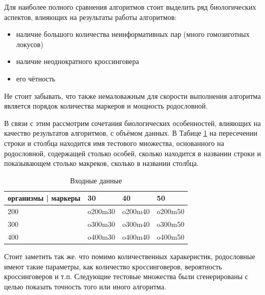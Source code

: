 \documentclass{matmex-diploma-custom}
\begin{document}
Для наиболее полного сравнения алгоритмов стоит выделить ряд
биологических аспектов, влияющих на результаты работы алгоритмов:
\begin{itemize}
\item наличие большого количества неинформативных пар (много
  гомозиготных локусов)
\item наличие неоднократного кроссинговера
\item его чётность
\end{itemize}

Не стоит забывать, что также немаловажным для скорости выполнения
алгоритма является порядок количества маркеров и мощность родословной.

В связи с этим рассмотрим сочетания биологических особенностей,
влияющих на качество результатов алгоритмов, с объёмом данных.  В
Табице \ref{tab:data} на пересечении строки и столбца находится имя
тестового множества, основанного на родословной, содержащей столько
особей, сколько находится в названии строки и показывающем столько
макреков, сколько в названии столбца.

\begin{table}[h]
  \centering
\begin{tabular}{llll}
\hline
организмы |  маркеры & 30 & 40 & 50 \\
\hline
200 & o200m30 & o200m40 & o200m50 \\
300 & o300m30 & o300m40 & o300m50 \\
400 & o400m30 & o400m40 & o400m50 \\
\hline
\end{tabular}
  \caption{Входные данные}
  \label{tab:data}
\end{table}

Стоит заметить так же. что помимо количественных харакеристик,
родословные имеют такие параметры, как количество кроссинговеров,
вероятность кроссинговеров и т.п. Следующие тестовые множества были
сгенерированы с целью показать точность того или иного алгоритма.
\end{document}
